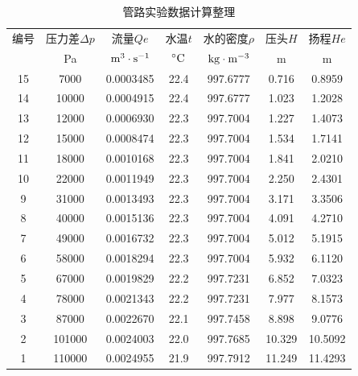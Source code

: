 \documentclass[UTF8,AutoFakeBold,a4paper]{article}
\begin{document}
\begin{table}[h]
		\centering
		\begin{tabular}{ccccccc}
		\toprule
		编号 & 压力差$\Delta p$ & 流量$Qe$ & 水温$t$ & 水的密度$\rho$ & 压头$H$ & 扬程$He$\\ 
		&Pa&$\rm{m}^{3}\cdot\rm{s}^{-1}$&$^{\circ}\rm{C}$&$\rm{kg}\cdot\rm{m}^{-3}$&m&m\\
		\midrule
        15 & 7000 & 0.0003485 & 22.4 & 997.6777 & 0.716 & 0.8959 \\ 
        14 & 10000 & 0.0004915 & 22.4 & 997.6777 & 1.023 & 1.2028 \\ 
        13 & 12000 & 0.0006930 & 22.3 & 997.7004 & 1.227 & 1.4073 \\ 
        12 & 15000 & 0.0008474 & 22.3 & 997.7004 & 1.534 & 1.7141 \\ 
        11 & 18000 & 0.0010168 & 22.3 & 997.7004 & 1.841 & 2.0210 \\ 
        10 & 22000 & 0.0011949 & 22.3 & 997.7004 & 2.250 & 2.4301 \\ 
        9 & 31000 & 0.0013493 & 22.3 & 997.7004 & 3.171 & 3.3506 \\ 
        8 & 40000 & 0.0015136 & 22.3 & 997.7004 & 4.091 & 4.2710 \\ 
        7 & 49000 & 0.0016732 & 22.3 & 997.7004 & 5.012 & 5.1915 \\ 
        6 & 58000 & 0.0018294 & 22.3 & 997.7004 & 5.932 & 6.1120 \\ 
        5 & 67000 & 0.0019829 & 22.2 & 997.7231 & 6.852 & 7.0323 \\ 
        4 & 78000 & 0.0021343 & 22.2 & 997.7231 & 7.977 & 8.1573 \\ 
        3 & 87000 & 0.0022670 & 22.1 & 997.7458 & 8.898 & 9.0776 \\ 
        2 & 101000 & 0.0024003 & 22.0 & 997.7685 & 10.329 & 10.5092 \\ 
        1 & 110000 & 0.0024955 & 21.9 & 997.7912 & 11.249 & 11.4293\\
        \bottomrule
		\end{tabular}	
		\label{ta1}
		\caption{管路实验数据计算整理}
\end{table}
\newpage
\end{document}
